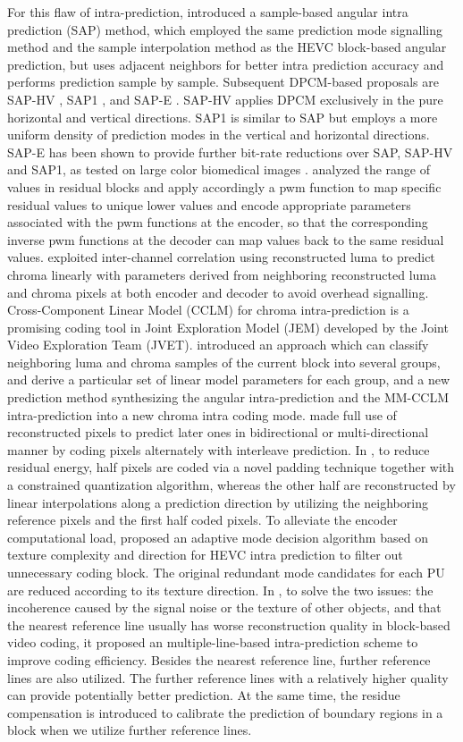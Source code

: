\documentclass[journal]{IEEEtran}
\begin{document}
For this flaw of intra-prediction, \cite{09} introduced a sample-based angular intra prediction (SAP) method, which employed the same prediction mode signalling method and the sample interpolation method as the HEVC block-based angular prediction, but uses adjacent neighbors for better intra prediction accuracy and performs prediction sample by sample. Subsequent DPCM-based proposals are SAP-HV \cite{10}, SAP1 \cite{11}, and SAP-E \cite{12}. SAP-HV applies DPCM exclusively in the pure horizontal and vertical directions. SAP1 is similar to SAP but employs a more uniform density of prediction modes in the vertical and horizontal directions. SAP-E has been shown to provide further bit-rate reductions over SAP, SAP-HV and SAP1, as tested on large color biomedical images \cite{12}. \cite{13} analyzed the range of values in residual blocks and apply accordingly a pwm function to map specific residual values to unique lower values and encode appropriate parameters associated with the pwm functions at the encoder, so that the corresponding inverse pwm functions at the decoder can map values back to the same residual values. \cite{14} exploited inter-channel correlation using  reconstructed luma  to predict chroma linearly with parameters derived from neighboring reconstructed luma and chroma pixels at both encoder and decoder to avoid overhead signalling. Cross-Component Linear Model (CCLM) for chroma intra-prediction is a promising coding tool in Joint Exploration Model (JEM) developed by the Joint Video Exploration Team (JVET). \cite{15} introduced an approach which can classify neighboring luma and chroma samples of the current block into several groups, and derive a particular set of linear model parameters for each group,  and a new prediction method synthesizing the angular intra-prediction and the MM-CCLM intra-prediction into a new chroma intra coding mode. \cite{16} made full use of reconstructed pixels to predict later ones in bidirectional or multi-directional manner by coding pixels alternately with interleave prediction. In \cite{17}, to reduce residual energy, half pixels are coded via a novel padding technique together with a constrained quantization algorithm, whereas the other half are reconstructed by linear interpolations along a prediction direction by utilizing the neighboring reference pixels and the first half coded pixels. To alleviate the encoder computational load, \cite{18} proposed an adaptive mode decision algorithm based on texture complexity and direction for HEVC intra prediction to filter out unnecessary coding block. The original redundant mode candidates for each PU are reduced according to its texture direction. In \cite{19}, to solve the two issues: the incoherence caused by the signal noise or the texture  of  other  objects,  and  that  the  nearest  reference line usually has worse reconstruction quality in block-based video coding, it proposed an multiple-line-based intra-prediction scheme to improve coding efficiency.  Besides the nearest reference line, further reference lines are also utilized. The further reference lines with a relatively higher quality can provide potentially better prediction. At the same time, the residue compensation is introduced to calibrate the prediction of boundary regions in a block when we utilize further reference lines.
\end{document}
